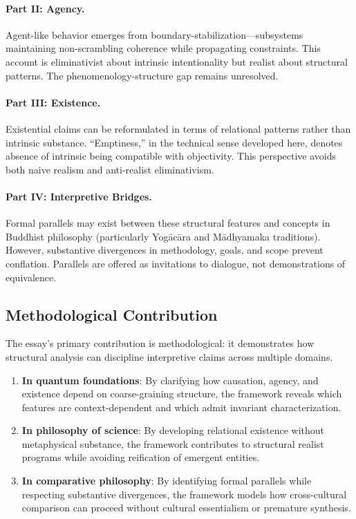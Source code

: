 \documentclass[12pt,a4paper,openany]{book}
\begin{document}
\paragraph{Part II: Agency.}
Agent-like behavior emerges from boundary-stabilization—subsystems maintaining non-scrambling coherence while propagating constraints. This account is eliminativist about intrinsic intentionality but realist about structural patterns. The phenomenology-structure gap remains unresolved.

\paragraph{Part III: Existence.}
Existential claims can be reformulated in terms of relational patterns rather than intrinsic substance. ``Emptiness,'' in the technical sense developed here, denotes absence of intrinsic being compatible with objectivity. This perspective avoids both naive realism and anti-realist eliminativism.

\paragraph{Part IV: Interpretive Bridges.}
Formal parallels may exist between these structural features and concepts in Buddhist philosophy (particularly Yog\=ac\=ara and M\=adhyamaka traditions). However, substantive divergences in methodology, goals, and scope prevent conflation. Parallels are offered as invitations to dialogue, not demonstrations of equivalence.

\subsection{Methodological Contribution}

The essay's primary contribution is methodological: it demonstrates how structural analysis can discipline interpretive claims across multiple domains.

\begin{enumerate}
\item \textbf{In quantum foundations}: By clarifying how causation, agency, and existence depend on coarse-graining structure, the framework reveals which features are context-dependent and which admit invariant characterization.

\item \textbf{In philosophy of science}: By developing relational existence without metaphysical substance, the framework contributes to structural realist programs while avoiding reification of emergent entities.

\item \textbf{In comparative philosophy}: By identifying formal parallels while respecting substantive divergences, the framework models how cross-cultural comparison can proceed without cultural essentialism or premature synthesis.
\end{enumerate}
\end{document}
